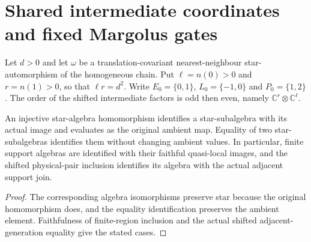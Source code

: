 \section{Shared intermediate coordinates and fixed Margolus gates}
\label{sec:qca_constant_margolus}

Let $d>0$ and let $\omega$ be a translation-covariant nearest-neighbour
star-automorphism of the homogeneous chain. Put $\ell=n(0)>0$ and
$r=n(1)>0$, so that $\ell r=d^2$. Write $E_0=\{0,1\}$,
$L_0=\{-1,0\}$ and $P_0=\{1,2\}$. The order of the shifted intermediate
factors is odd then even, namely $\mathbb C^r\otimes\mathbb C^\ell$.

\begin{lemma}
    \label{lem:qca_support_coordinate_equivalences}
    \leanok
    An injective star-algebra homomorphism identifies a star-subalgebra
    with its actual image and evaluates as the original ambient map.
    Equality of two star-subalgebras identifies them without changing
    ambient values. In particular, finite support algebras are identified
    with their faithful quasi-local images, and the shifted physical-pair
    inclusion identifies its algebra with the actual adjacent support join.
\end{lemma}
\begin{proof}
    \leanok
    The corresponding algebra isomorphisms preserve star because the
    original homomorphism does, and the equality identification preserves
    the ambient element. Faithfulness of finite-region inclusion and the
    actual shifted adjacent-generation equality give the stated cases.
\end{proof}

